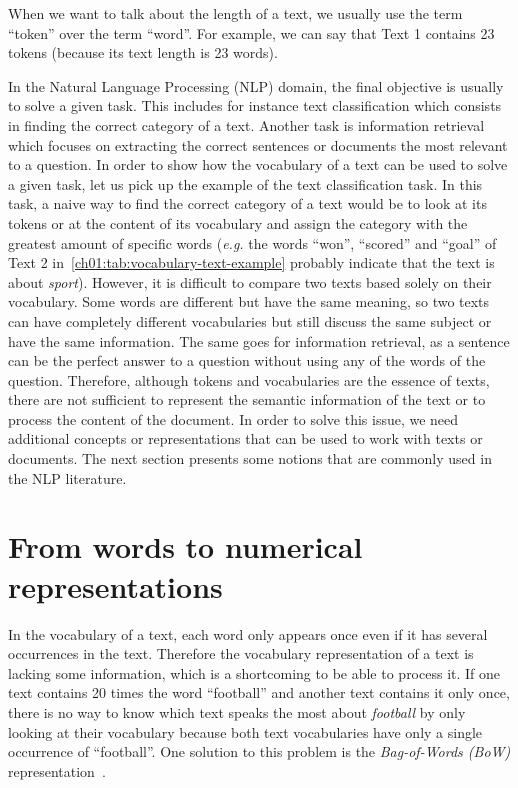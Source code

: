   \noindent When we want to talk about the length of a text, we usually use the
  term ``token'' over the term ``word''. For example, we can say that Text 1
  contains 23 tokens (because its text length is 23 words).\medskip

  In the Natural Language Processing (NLP) domain, the final objective is
  usually to solve a given task. This includes for instance text classification
  which consists in finding the correct category of a text. Another task is
  information retrieval which focuses on extracting the correct sentences or
  documents the most relevant to a question. In order to show how the vocabulary
  of a text can be used to solve a given task, let us pick up the example of the
  text classification task. In this task, a naive way to find the correct
  category of a text would be to look at its tokens or at the content of its
  vocabulary and assign the category with the greatest amount of specific words
  (\textit{e.g.} the words ``won'', ``scored'' and ``goal'' of Text 2
  in~\autoref{ch01:tab:vocabulary-text-example} probably indicate that the text
  is about \textit{sport}). However, it is difficult to compare two texts based
  solely on their vocabulary. Some words are different but have the same
  meaning, so two texts can have completely different vocabularies but still
  discuss the same subject or have the same information. The same goes for
  information retrieval, as a sentence can be the perfect answer to a question
  without using any of the words of the question. Therefore, although tokens and
  vocabularies are the essence of texts, there are not sufficient to represent
  the semantic information of the text or to process the content of the
  document. In order to solve this issue, we need additional concepts or
  representations that can be used to work with texts or documents. The next
  section presents some notions that are commonly used in the NLP literature.

\section{From words to numerical representations}
  In the vocabulary of a text, each word only appears once even if it has
  several occurrences in the text. Therefore the vocabulary representation of a
  text is lacking some information, which is a shortcoming to be able to process
  it. If one text contains 20 times the word ``football'' and another text
  contains it only once, there is no way to know which text speaks the most
  about \textit{football} by only looking at their vocabulary because both text
  vocabularies have only a single occurrence of ``football''. One solution to
  this problem is the \textit{Bag-of-Words (BoW)}
  representation~\citep{lang1995newsweeder, joachims1997probabilistic}.

